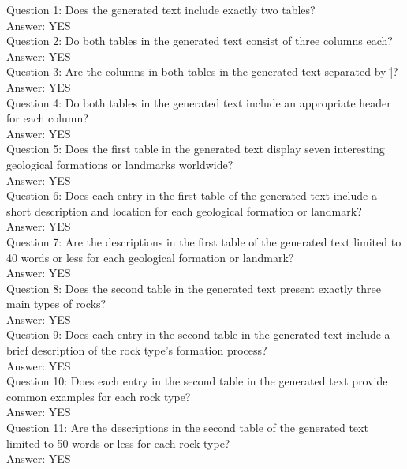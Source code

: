 \begin{tcolorbox}[title=Questions for Example 1,breakable]
Question 1: Does the generated text include exactly two tables?\\Answer: YES\\Question 2: Do both tables in the generated text consist of three columns each?\\Answer: YES\\Question 3: Are the columns in both tables in the generated text separated by \"|\"?\\Answer: YES\\Question 4: Do both tables in the generated text include an appropriate header for each column?\\Answer: YES\\Question 5: Does the first table in the generated text display seven interesting geological formations or landmarks worldwide?\\Answer: YES\\Question 6: Does each entry in the first table of the generated text include a short description and location for each geological formation or landmark?\\Answer: YES\\Question 7: Are the descriptions in the first table of the generated text limited to 40 words or less for each geological formation or landmark?\\Answer: YES\\Question 8: Does the second table in the generated text present exactly three main types of rocks?\\Answer: YES\\Question 9: Does each entry in the second table in the generated text include a brief description of the rock type's formation process?\\Answer: YES\\Question 10: Does each entry in the second table in the generated text provide common examples for each rock type?\\Answer: YES\\Question 11: Are the descriptions in the second table of the generated text limited to 50 words or less for each rock type?\\Answer: YES\\
\end{tcolorbox}

